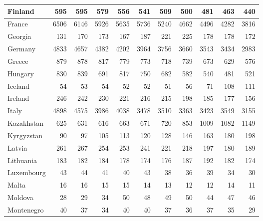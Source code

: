 \begin{table}
\begin{tabular}{|l|r|r|r|r|r|r|r|r|r|r|}
                       Finland&    595&    595&    579&    556&    541&    509&    500&    481&    463&    440\\\hline
                        France&   6506&   6146&   5926&   5635&   5736&   5240&   4662&   4496&   4282&   3816\\\hline
                       Georgia&    131&    170&    173&    167&    187&    221&    225&    178&    178&    172\\\hline
                       Germany&   4833&   4657&   4382&   4202&   3964&   3756&   3660&   3543&   3434&   2983\\\hline
                        Greece&    879&    878&    817&    779&    773&    718&    739&    673&    629&    576\\\hline
                       Hungary&    830&    839&    691&    817&    750&    682&    582&    540&    481&    521\\\hline
                       Iceland&     54&     53&     54&     52&     52&     51&     56&     71&    108&    111\\\hline
                       Ireland&    246&    242&    230&    221&    216&    215&    198&    185&    177&    156\\\hline
                         Italy&   4898&   4575&   3986&   4038&   3478&   3510&   3363&   3423&   3549&   3155\\\hline
                    Kazakhstan&    625&    631&    616&    663&    671&    720&    853&   1009&   1082&   1149\\\hline
                    Kyrgyzstan&     90&     97&    105&    113&    120&    128&    146&    163&    180&    198\\\hline
                        Latvia&    261&    267&    254&    253&    241&    221&    218&    197&    180&    189\\\hline
                     Lithuania&    183&    182&    184&    178&    174&    176&    187&    192&    182&    174\\\hline
                    Luxembourg&     43&     44&     41&     40&     43&     38&     36&     39&     34&     30\\\hline
                         Malta&     16&     16&     15&     15&     14&     13&     12&     12&     14&     11\\\hline
                       Moldova&     28&     29&     34&     50&     48&     49&     50&     44&     47&     46\\\hline
                    Montenegro&     40&     37&     34&     40&     40&     37&     36&     37&     35&     29\\\hline

\end{tabular}
\end{table}
